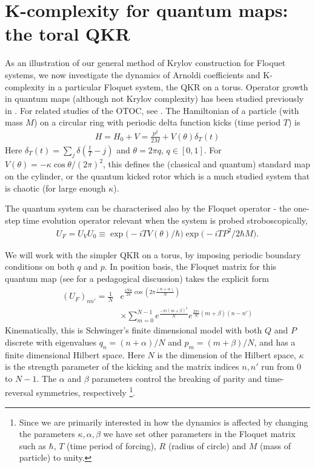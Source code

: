 \documentclass[a4paper,12pt]{article}
\begin{document}
\section{K-complexity for quantum maps: the toral QKR} \label{TQKR}

As an illustration of our general method of Krylov construction for Floquet systems, we now investigate the dynamics of Arnoldi coefficients and K-complexity in a particular Floquet system, the QKR on a torus. Operator growth in quantum maps (although not Krylov complexity) has been studied previously in \cite{Sondhi:2018mvf}. For related studies of the OTOC, see \cite{Garcia-Mata:2018slr, Lakshminarayan:2018bge}.
The Hamiltonian of a particle (with mass $M$) on a circular ring with periodic delta function kicks (time period $T$) is
\begin{align} \label{HK}
H= H_0+V= \frac{p^ 2}{2 M}+ V(\theta)\delta_T(t)
\end{align}
 Here $\delta_T(t)= \sum_j \delta(\frac{t}{T}-j)$ and $\theta= 2 \pi q $, $q \in [0,1]$. For $V(\theta)= - \kappa \cos \theta / (2\pi)^2$, this defines the (classical and quantum) standard map on the cylinder, or the quantum kicked rotor which is a much studied system that is chaotic (for large enough $\kappa$).

The quantum system can be characterised also by the Floquet operator - the one-step time evolution operator relevant when the system is probed stroboscopically,
\begin{align}  
U_F=U_V U_0 \equiv \exp\big(-i T V(\theta)/\hbar\big)\exp\big(-i T P^ 2/2\hbar M\big).
\end{align}  

We will work with the simpler QKR on a torus, by imposing periodic boundary conditions on both $q$ and $p$. In position basis, the Floquet matrix for this quantum map (see \cite{lakshminarayan_2022} for a pedagogical discussion) takes the explicit form
   \begin{align*}
    (U_F)_{nn'} = \frac{1}{N}&e^{\frac{iN\kappa}{2\pi}\cos(2\pi\frac{(n+\alpha)}{N})}\\&\times\sum_{m=0}^{N-1}e^{\frac{-\pi i (m+\beta)^2}{N}} e^{\frac{2\pi i}{N}(m+\beta)(n-n')}
\end{align*}
Kinematically, this is Schwinger's finite dimensional model \cite{10.2307/70873} with both $Q$ and $P$ discrete with eigenvalues $q_n=(n + \alpha)/N$ and $p_m=(m + \beta)/N$, and has a finite dimensional Hilbert space. Here $N$ is the dimension of the Hilbert space, $\kappa$ is the strength parameter of the kicking and the matrix indices $n, n'$ run from $0$ to $N-1$. The $\alpha$ and $\beta$ parameters control the breaking of parity and time-reversal symmetries, respectively \footnote{Since we are primarily interested in how the dynamics is affected by changing the parameters $\kappa, \alpha, \beta$ we have set other parameters in the Floquet matrix such as $\hbar$, $T$ (time period of forcing), $R$ (radius of circle) and $M$ (mass of particle) to unity.}.
\end{document}
